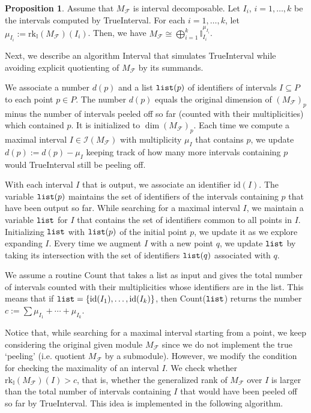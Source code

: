 \documentclass[11pt]{article}
\theoremstyle{definition}
\newtheorem{proposition}[theorem]{Proposition}
\newcommand{\intrk}{\mathrm{rk}_{\mathbb{I}}}
\newcommand{\I}{\mathbb{I}}
\newcommand{\Pb}{P}
\newcommand{\Fcal}{\mathcal{F}}
\begin{document}
\begin{proposition}\label{prop:intervals}
Assume that $M_{\Fcal}$ is interval decomposable. Let $I_i$, $i=1,\ldots, k$ be the intervals computed by {\sc TrueInterval}. For each $i=1,\ldots, k$,
let $\mu_{I_i}:=\intrk(M_\Fcal)({I_i})$.
Then, we have $M_\Fcal \cong \bigoplus_{i=1}^k \I_{I_i}^{\mu_{I_i}}$.
\end{proposition}




Next, we describe an algorithm {\sc Interval}
that simulates {\sc TrueInterval}
while avoiding explicit quotienting of $M_{\mathcal F}$ by its summands. 

We associate a number $d(p)$ and a list ${\tt list}(p)$ of identifiers of intervals $I\subseteq P$ to each point $p\in \Pb$. The number $d(p)$ equals the original
dimension of $(M_{\mathcal F})_p$ minus the
number of intervals peeled off so far (counted with their multiplicities) 
which contained $p$.
It is initialized to $\dim (M_{\mathcal F})_p$.
Each time we compute
a maximal interval $I\in \mathcal{I}(M_\Fcal)$ with multiplicity $\mu_I$ that contains $p$, we update 
$d(p):=d(p)-\mu_I$ keeping track of how many more intervals containing $p$ would
{\sc TrueInterval}  still be peeling off. 


With each interval $I$ that is output, we associate an identifier 
$\mathrm{id}(I)$.
The variable ${\tt list}(p)$ maintains the set of identifiers of the intervals
containing $p$ that have been output so far. While searching for a maximal
interval $I$, we maintain a variable ${\tt list}$ for $I$
that contains the set of identifiers common to all points in $I$. Initializing
${\tt list}$ with ${\tt list}(p)$ of the initial point $p$,
we update it as we explore expanding $I$.
Every time we augment $I$ with a new point
$q$, we update ${\tt list}$ by taking its intersection with the
set of identifiers ${\tt list}(q)$ associated with $q$.

We assume a routine {\sc Count} that takes a list as input and gives the total
number of intervals counted with their multiplicities whose identifiers are in the
list. This means that if ${\tt list}=\{\mathrm{id}(I_1),\ldots,\mathrm{id}(I_k)\}$,
then {\sc Count}($\tt list$) returns the number $c:=\sum \mu_{I_1}+\cdots+\mu_{I_k}$. 

Notice that, while searching for a
maximal interval starting from a point, we keep considering the original
given module $M_{\mathcal F}$ since we do not implement the true `peeling' (i.e. quotient $M_{\Fcal}$ by a submodule).
However, we modify the condition for checking the maximality of an interval $I$.
We check whether 
$\intrk(M_{\Fcal})(I)>c$, that is, whether the generalized
rank of $M_{\Fcal}$ over $I$ is larger than the total number of
intervals containing $I$ that would have been peeled off so far by {\sc TrueInterval}.
This idea is implemented in the following algorithm.\\
\end{document}

